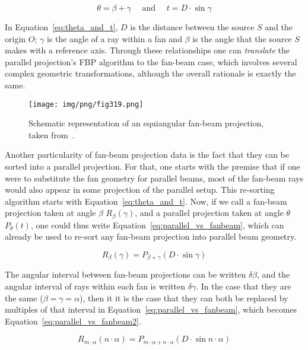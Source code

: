 \begin{equation}
    \label{eq:theta_and_t}
    \theta = \beta + \gamma \quad \text{ and } \quad t = D \cdot \sin \gamma
\end{equation}

In Equation~\ref{eq:theta_and_t}, $D$ is the distance between the source
$S$ and the origin $O$; $\gamma$ is the angle of a ray within a fan and
$\beta$ is the angle that the source $S$ makes with a reference axis.
Through these relationships one can \emph{translate} the parallel
projection's \gls{FBP} algorithm to the fan-beam case, which involves several
complex geometric transformations, although the overall rationale is
exactly the same.

\begin{figure}[htpb]
    \centering
    \texttt{[image: img/png/fig319.png]}
    \caption{Schematic representation of an equiangular fan-beam
    projection, taken from~\cite{Kak2001}.}
    \label{fig:equiangular}
\end{figure}

Another particularity of fan-beam projection data is the fact that they
can be sorted into a parallel projection. For that, one starts with the
premise that if one were to substitute the fan geometry for parallel
beams, most of the fan-beam rays would also appear in some projection of
the parallel setup. This re-sorting algorithm starts with
Equation~\ref{eq:theta_and_t}. Now, if we call a fan-beam projection
taken at angle $\beta$ $R_{\beta}(\gamma)$, and a parallel projection
taken at angle $\theta$ $P_{\theta}(t)$, one could thus write
Equation~\ref{eq:parallel_vs_fanbeam}, which can already be used to
re-sort any fan-beam projection into parallel beam geometry.

\begin{equation}
    \label{eq:parallel_vs_fanbeam}
    R_{\beta}(\gamma) = P_{\beta + \gamma}(D \cdot \sin \gamma)
\end{equation}

The angular interval between fan-beam projections can be written
$\delta\beta$, and the angular interval of rays within each fan is
written $\delta\gamma$. In the case that they are the same
($\beta=\gamma=\alpha$), then it it is the case that they can both be
replaced by multiples of that interval in
Equation~\ref{eq:parallel_vs_fanbeam}, which becomes
Equation~\ref{eq:parallel_vs_fanbeam2}.

\begin{equation}
    \label{eq:parallel_vs_fanbeam2}
    R_{m \cdot \alpha}(n \cdot\alpha) = P_{m \cdot\alpha + n
    \cdot\alpha}(D \cdot \sin n \cdot\alpha)
\end{equation}

